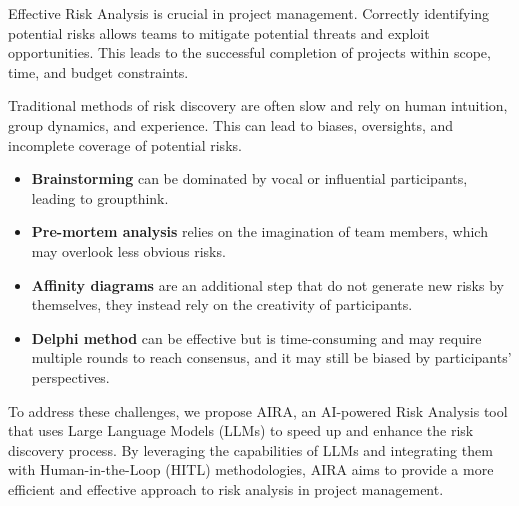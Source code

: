 Effective Risk Analysis is crucial in project management.
Correctly identifying potential risks allows teams to 
mitigate potential threats and exploit opportunities.
This leads to the successful completion of projects
within scope, time, and budget constraints.
    
Traditional methods of risk discovery are often slow
and rely on human intuition, group dynamics, and experience.
This can lead to biases, oversights, and incomplete coverage
of potential risks.
\begin{itemize}
    \item \textbf{Brainstorming} can be dominated by vocal or
    influential participants, leading to groupthink.
    \item \textbf{Pre-mortem analysis} relies on the imagination
    of team members, which may overlook less obvious risks.
    \item \textbf{Affinity diagrams} are an additional step
    that do not generate new risks by themselves, they instead
    rely on the creativity of participants.
    \item \textbf{Delphi method} can be effective but is
    time-consuming and may require multiple rounds to
    reach consensus, and it may still be biased by
    participants' perspectives.
\end{itemize}

To address these challenges, we propose AIRA, an AI-powered
Risk Analysis tool that uses Large Language Models (LLMs)
to speed up and enhance the risk discovery process.
By leveraging the capabilities of LLMs and integrating
them with Human-in-the-Loop (HITL) methodologies, AIRA
aims to provide a more efficient and effective approach
to risk analysis in project management.